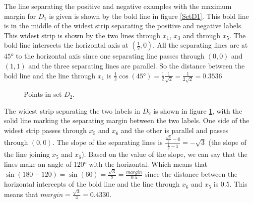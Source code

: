 \begin{enumerate}
\begin{enumerate}
The line separating the positive and negative examples with the maximum margin for $D_1$ is given is shown by the bold line in figure \ref{SetD1}. This bold line is in the middle of the widest strip separating the positive and negative labels. This widest strip is shown by the two lines through $x_1$, $x_3$ and through $x_5$. The bold line intersects the horizontal axis at $(\frac{1}{2}, 0)$. All the separating lines are at $45 \si{\degree}$ to the horizontal axis since one separating line passes through $(0, 0)$ and $(1, 1)$ and the three separating lines are parallel. So the distance between the bold line and the line through $x_1$ is $\frac{1}{2} \cos(45\si{\degree}) =  \frac{1}{2} \frac{1}{\sqrt{2}} =  \frac{1}{2\sqrt{2}}=0.3536$

   
   \begin{figure}[H]
    \centering
    \caption{Points in set $D_2$.} \label{SetD2}
  \end{figure}  

The widest strip separating the two labels in $D_2$ is shown in figure \ref{SetD2}, with the solid line marking the separating margin between the two labels. One side of the widest strip passes through $x_5$ and $x_6$ and the other is parallel and passes through $(0, 0)$. The slope of the separating lines is $\frac{\frac{\sqrt{3}}{2} - 0}{\frac{1}{2} -1} = -\sqrt{3}$ (the slope of the line joining $x_5$ and $x_6$). Based on the value of the slope, we can say that the lines make an angle of $120 \si{\degree}$ with the horizontal. Which means that $\sin(180 - 120) = \sin(60) = \frac{\sqrt{3}}{2} = \frac{margin}{0.5}$ since the distance between the horizontal intercepts of the bold line and the line through $x_6$ and $x_5$ is $0.5$. This means that $margin = \frac{\sqrt{3}}{4} =0.4330$.
   

\end{enumerate}
\end{enumerate}
